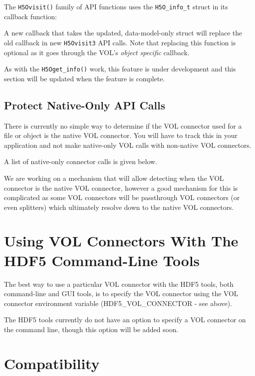 \thgfuturewarning

The {\tt H5Ovisit()} family of API functions uses the {\tt H5O\_info\_t} struct in its callback function:

\quad {}

A new callback that takes the updated, data-model-only struct will replace the old callback in new {\tt H5Ovisit3} API calls. Note that replacing this function is optional as it goes through the VOL's \textit{object specific} callback.

As with the {\tt H5Oget\_info()} work, this feature is under development and this section will be updated when the feature is complete.

\subsection{Protect Native-Only API Calls}

There is currently no simple way to determine if the VOL connector used for a file or object is the native VOL connector. You will have to track this in your application and not make native-only VOL calls with non-native VOL connectors.

A list of native-only connector calls is given below.

We are working on a mechanism that will allow detecting when the VOL connector is the native VOL connector, however a good mechanism for this is complicated as some VOL connectors will be passthrough VOL connectors (or even splitters) which ultimately resolve down to the native VOL connectors.

\section{Using VOL Connectors With The HDF5 Command-Line Tools}

The best way to use a particular VOL connector with the HDF5 tools, both command-line and GUI tools, is to specify the VOL connector using the VOL connector environment variable (HDF5\_VOL\_CONNECTOR - see above).

The HDF5 tools currently do not have an option to specify a VOL connector on the command line, though this option will be added soon.

\section{Compatibility}
